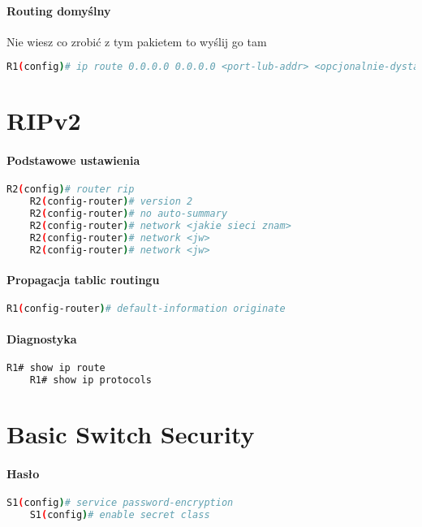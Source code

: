 \documentclass[12pt]{article}
\begin{document}
	\paragraph{Routing domyślny}
	Nie wiesz co zrobić z tym pakietem to wyślij go tam
	\begin{lstlisting}[language=bash]
	R1(config)# ip route 0.0.0.0 0.0.0.0 <port-lub-addr> <opcjonalnie-dystans-administracyjny>
	\end{lstlisting}
		
\newpage
	
\section{RIPv2}
	\paragraph{Podstawowe ustawienia}
	\begin{lstlisting}[language=bash]
	R2(config)# router rip
	R2(config-router)# version 2
	R2(config-router)# no auto-summary 
	R2(config-router)# network <jakie sieci znam>
	R2(config-router)# network <jw>
	R2(config-router)# network <jw>
	\end{lstlisting}
		
	\paragraph{Propagacja tablic routingu}
	\begin{lstlisting}[language=bash]
	R1(config-router)# default-information originate 
	\end{lstlisting}
		
	\paragraph{Diagnostyka}
	\begin{lstlisting}[language=bash]
	R1# show ip route
	R1# show ip protocols
	\end{lstlisting}
		
\newpage

\section{Basic Switch Security}
	\paragraph{Hasło}
	\begin{lstlisting}[language=bash]
	S1(config)# service password-encryption 
	S1(config)# enable secret class
	\end{lstlisting}
		
\end{document}
